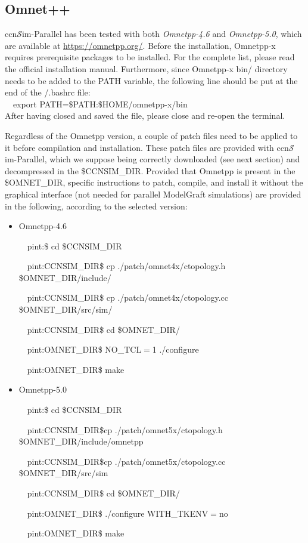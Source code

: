\documentclass[10pt]{article}
\newcommand{\ccnsim}{ccn\ensuremath{\mathcal{S}}im} %
\newcommand{\textapprox}{\raisebox{0.5ex}{\texttildelow}}
\newcommand{\colorboxg}[1]{{\colorbox{gray!20}{#1}}}
\begin{document}
\subsection*{Omnet++}
\ccnsim-Parallel has been tested with both \emph{Omnetpp-4.6} and \emph{Omnetpp-5.0}, which are available at \url{https://omnetpp.org/}. 
Before the installation, Omnetpp-x requires prerequisite packages to be installed. For the complete list, please read the official installation manual. 
Furthermore, since Omnetpp-x bin/ directory needs to be added to the PATH variable, the following line should be put at the end of the \colorboxg{\textapprox/.bashrc} file: \\ 

\ \ \colorboxg{export PATH=\$PATH:\$HOME/omnetpp-x/bin} \\

After having closed and saved the file, please close and re-open the terminal.

\noindent Regardless of the Omnetpp version, a couple of patch files need to be applied to it before compilation and installation. 
These patch files are provided with \ccnsim-Parallel, which we suppose being correctly downloaded (see next section) and decompressed in the \$CCNSIM\_DIR.
Provided that Omnetpp is present in the \$OMNET\_DIR, specific instructions to patch, compile, and install it without the graphical interface (not needed for parallel ModelGraft simulations) are provided in the following, according to the selected version:

\begin{itemize}
     \item Omnetpp-4.6

     \ \ \colorboxg{pint:\textapprox\$ cd \$CCNSIM\_DIR} 

     \ \ \colorboxg{pint:CCNSIM\_DIR\$ cp ./patch/omnet\-4x/ctopology.h \$OMNET\_DIR/include/}

     \ \ \colorboxg{pint:CCNSIM\_DIR\$ cp ./patch/omnet\-4x/ctopology.cc \$OMNET\_DIR/src/sim/}

     \ \ \colorboxg{pint:CCNSIM\_DIR\$ cd \$OMNET\_DIR/}

     \ \ \colorboxg{pint:OMNET\_DIR\$ NO\_TCL$=$1 ./configure}

     \ \ \colorboxg{pint:OMNET\_DIR\$ make}


     \item Omnetpp-5.0

     \ \ \colorboxg{pint:\textapprox\$ cd \$CCNSIM\_DIR}

     \ \ \colorboxg{pint:CCNSIM\_DIR\$cp ./patch/omnet\-5x/ctopology.h \$OMNET\_DIR/include/omnetpp}

     \ \ \colorboxg{pint:CCNSIM\_DIR\$cp ./patch/omnet\-5x/ctopology.cc \$OMNET\_DIR/src/sim}

     \ \ \colorboxg{pint:CCNSIM\_DIR\$ cd \$OMNET\_DIR/}

     \ \ \colorboxg{pint:OMNET\_DIR\$ ./configure WITH\_TKENV$=$no }

     \ \ \colorboxg{pint:OMNET\_DIR\$ make}
\end{itemize}
\end{document}
